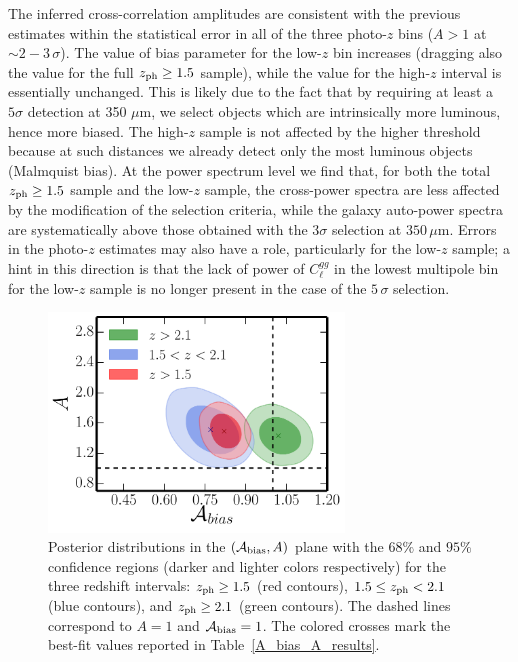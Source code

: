 The inferred cross-correlation amplitudes are consistent with the previous estimates within the statistical error in all of the three photo-$z$ bins ($A>1$ at $\sim2-3\,\sigma$). The value of bias parameter for the low-$z$ bin increases (dragging also the value for the full $z_{\rm{ph}}\ge1.5$ sample), while the value for the high-$z$ interval is essentially unchanged. This is likely due to the fact that by requiring at least a $5\sigma$ detection at 350 $\mu$m, we select objects which are intrinsically more luminous, hence more biased. The high-$z$ sample is not affected by the higher threshold because at such distances we already detect only the most luminous objects (Malmquist bias). At the power spectrum level we find that, for both the total $z_{\rm{ph}}\ge1.5$ sample and the low-$z$ sample, the cross-power spectra are less affected by the modification of the selection criteria, while the galaxy auto-power spectra are systematically above those obtained with the $3\sigma$ selection at $350\,\mu$m. Errors in the photo-$z$ estimates may also have a role, particularly for the low-$z$ sample; a hint in this direction is that the lack of power of $C_{\ell}^{gg}$ in the lowest multipole bin for the low-$z$ sample is no longer present in the case of the $5\,\sigma$ selection.

\begin{figure} %
\centering %
\includegraphics[width=0.7\textwidth]{Chapter4/Images/A_bias_A_kggg_2015}
\caption{Posterior distributions in the $(\mathcal{A}_{\rm{bias}},A)$ plane with the $68\%$ and $95\%$ confidence regions (darker and lighter colors respectively) for the three redshift intervals: $z_{\rm{ph}} \ge 1.5$ (red contours), $1.5 \le z_{\rm{ph}} < 2.1$ (blue contours), and $z_{\rm{ph}} \ge 2.1$ (green contours). The dashed lines correspond to $A=1$ and $\mathcal{A}_{\rm{bias}}=1$. The colored crosses mark the best-fit values reported in Table~\eqref{A_bias_A_results}. \label{fig:A_bias_A_kggg_2015}}
\end{figure}

